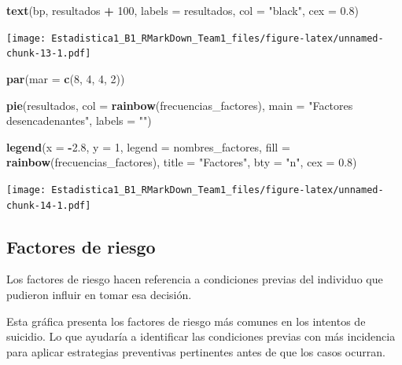 \documentclass[
]{article}
\newenvironment{Shaded}{\begin{snugshade}}{\end{snugshade}}
\newcommand{\AttributeTok}[1]{\textcolor[rgb]{0.13,0.29,0.53}{#1}}
\newcommand{\DecValTok}[1]{\textcolor[rgb]{0.00,0.00,0.81}{#1}}
\newcommand{\FloatTok}[1]{\textcolor[rgb]{0.00,0.00,0.81}{#1}}
\newcommand{\FunctionTok}[1]{\textcolor[rgb]{0.13,0.29,0.53}{\textbf{#1}}}
\newcommand{\NormalTok}[1]{#1}
\newcommand{\SpecialCharTok}[1]{\textcolor[rgb]{0.81,0.36,0.00}{\textbf{#1}}}
\newcommand{\StringTok}[1]{\textcolor[rgb]{0.31,0.60,0.02}{#1}}
\begin{document}
\begin{Shaded}
\begin{Highlighting}[]
\FunctionTok{text}\NormalTok{(bp, resultados }\SpecialCharTok{+} \DecValTok{100}\NormalTok{, }\AttributeTok{labels =}\NormalTok{ resultados, }\AttributeTok{col =} \StringTok{"black"}\NormalTok{, }\AttributeTok{cex =} \FloatTok{0.8}\NormalTok{)}
\end{Highlighting}
\end{Shaded}

\texttt{[image: Estadistica1\_B1\_RMarkDown\_Team1\_files/figure-latex/unnamed-chunk-13-1.pdf]}

\begin{Shaded}
\begin{Highlighting}[]
\FunctionTok{par}\NormalTok{(}\AttributeTok{mar =} \FunctionTok{c}\NormalTok{(}\DecValTok{8}\NormalTok{, }\DecValTok{4}\NormalTok{, }\DecValTok{4}\NormalTok{, }\DecValTok{2}\NormalTok{))}

\FunctionTok{pie}\NormalTok{(resultados, }\AttributeTok{col =} \FunctionTok{rainbow}\NormalTok{(frecuencias\_factores), }\AttributeTok{main =} \StringTok{"Factores desencadenantes"}\NormalTok{, }\AttributeTok{labels =} \StringTok{""}\NormalTok{)}

\FunctionTok{legend}\NormalTok{(}\AttributeTok{x =} \SpecialCharTok{{-}}\FloatTok{2.8}\NormalTok{, }\AttributeTok{y =} \DecValTok{1}\NormalTok{, }\AttributeTok{legend =}\NormalTok{ nombres\_factores, }\AttributeTok{fill =} \FunctionTok{rainbow}\NormalTok{(frecuencias\_factores), }\AttributeTok{title =} \StringTok{"Factores"}\NormalTok{, }\AttributeTok{bty =} \StringTok{"n"}\NormalTok{, }\AttributeTok{cex =} \FloatTok{0.8}\NormalTok{)}
\end{Highlighting}
\end{Shaded}

\texttt{[image: Estadistica1\_B1\_RMarkDown\_Team1\_files/figure-latex/unnamed-chunk-14-1.pdf]}

\subsection{Factores de riesgo}\label{factores-de-riesgo}

Los factores de riesgo hacen referencia a condiciones previas del
individuo que pudieron influir en tomar esa decisión.

Esta gráfica presenta los factores de riesgo más comunes en los intentos
de suicidio. Lo que ayudaría a identificar las condiciones previas con
más incidencia para aplicar estrategias preventivas pertinentes antes de
que los casos ocurran.
\end{document}
